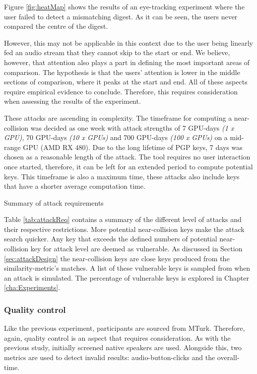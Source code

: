 Figure \ref{fig:heatMap} shows the results of an eye-tracking experiment where the user failed to detect a mismatching digest. As it can be seen, the users never compared the centre of the digest. 

However, this may not be applicable in this context due to the user being linearly fed an audio stream that they cannot skip to the start or end. We believe, however, that attention also plays a part in defining the most important areas of comparison. The hypothesis is that the users' attention is lower in the middle sections of comparison, where it peaks at the start and end. All of these aspects require empirical evidence to conclude. Therefore, this requires consideration when assessing the results of the experiment.

These attacks are ascending in complexity. The timeframe for computing a near-collision was decided as one week with attack strengths of 7 GPU-days \textit{(1 x GPU)}, 70 GPU-days \textit{(10 x GPUs)} and 700 GPU-days \textit{(100 x GPUs)} on a mid-range GPU (AMD RX 480). Due to the long lifetime of PGP keys, 7 days was chosen as a reasonable length of the attack. The tool requires no user interaction once started, therefore, it can be left for an extended period to compute potential keys. This timeframe is also a maximum time, these attacks also include keys that have a shorter average computation time.

\begin{table}[h!]
    \centering
    
    \caption{Summary of attack requirements}
    \label{tab:attackReq}
\end{table}

Table \ref{tab:attackReq} contains a summary of the different level of attacks and their respective restrictions. More potential near-collision keys make the attack search quicker. Any key that exceeds the defined numbers of potential near-collision key for attack level are deemed as vulnerable.  As discussed in Section \ref{sec:attackDesign} the near-collision keys are close keys produced from the similarity-metric's matches. A list of these vulnerable keys is sampled from when an attack is simulated. The percentage of vulnerable keys is explored in Chapter \ref{cha:Experiments}.

\subsubsection{Quality control}
\label{sec:exp2_quality}
Like the previous experiment, participants are sourced from MTurk. Therefore, again, quality control is an aspect that requires consideration. As with the previous study, initially screened native speakers are used. Alongside this, two metrics are used to detect invalid results: audio-button-clicks and the overall-time. 

